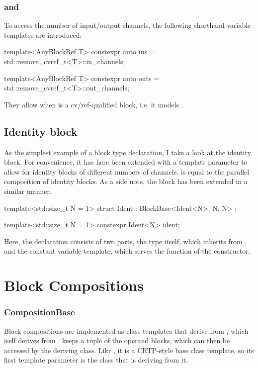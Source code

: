 \subsubsection{ and }

To access the number of input/output channels, the following shorthand variable templates are introduced:

\begin{cppcodenl}
  template<AnyBlockRef T>
  constexpr auto ins = std::remove_cvref_t<T>::in_channels;

  template<AnyBlockRef T>
  constexpr auto outs = std::remove_cvref_t<T>::out_channels;
\end{cppcodenl}

They allow  when  is a cv/ref-qualified block, i.e. it models .

\subsection{Identity block}
As the simplest example of a block type declaration, I take a look at the identity block. For convenience, it
has here been extended with a template parameter  to allow for identity blocks of
different numbers of channels.
 is equal to the parallel composition of  identity blocks. As a side note, the \Cut block has been
extended in a similar manner.

\begin{cppcodenl}
  template<std::size_t N = 1>
  struct Ident : BlockBase<Ident<N>, N, N> {};

  template<std::size_t N = 1>
  constexpr Ident<N> ident;
\end{cppcodenl}

Here, the declaration consists of two parts, the  type itself, which inherits from , and the constant
 variable template, which serves the function of the constructor.

\section{Block Compositions}

\subsubsection{CompositionBase}

Block compositions are implemented as class templates that derive from , which iself
derives from
.  keeps a tuple of the operand blocks, which can then be accessed by
the deriving class. Likr , it is a CRTP-style base class template, so its first
template parameter is the class that is deriving from it.

